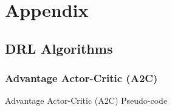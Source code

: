 \appendix

\chapter{Appendix} \label{ch:appendix}

\section{DRL Algorithms} \label{sec:app_drl_algorithms}

\subsection{Advantage Actor-Critic (A2C)} \label{sec:app_a2c}

\begin{algorithm}
\label{alg:a2c}
\caption{Advantage Actor-Critic (A2C) Pseudo-code}

\end{algorithm}